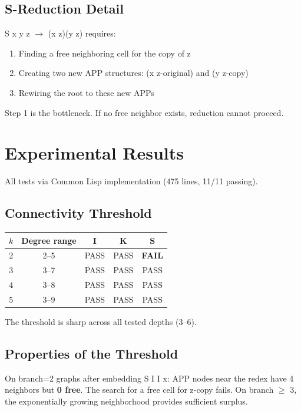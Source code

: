 \documentclass[11pt]{article}
\begin{document}
\subsection{S-Reduction Detail}

S x y z $\rightarrow$ (x z)(y z) requires:
\begin{enumerate}
\item Finding a free neighboring cell for the copy of z
\item Creating two new APP structures: (x z-original) and (y z-copy)
\item Rewiring the root to these new APPs
\end{enumerate}

Step 1 is the bottleneck. If no free neighbor exists, reduction cannot proceed.

\section{Experimental Results}

All tests via Common Lisp implementation (475 lines, 11/11 passing).

\subsection{Connectivity Threshold}

\begin{center}
\begin{tabular}{ccccc}
\toprule
$k$ & Degree range & I & K & S \\
\midrule
2 & 2--5 & PASS & PASS & \textbf{FAIL} \\
3 & 3--7 & PASS & PASS & PASS \\
4 & 3--8 & PASS & PASS & PASS \\
5 & 3--9 & PASS & PASS & PASS \\
\bottomrule
\end{tabular}
\end{center}

The threshold is sharp across all tested depths (3--6).

\subsection{Properties of the Threshold}

On branch=2 graphs after embedding S I I x: APP nodes near the redex have 4 neighbors but \textbf{0 free}. The search for a free cell for z-copy fails. On branch $\geq$ 3, the exponentially growing neighborhood provides sufficient surplus.
\end{document}
